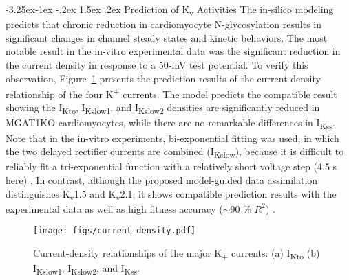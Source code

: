 \documentclass[11pt]{article}
\makeatletter
\renewcommand\subsection{\@startsection{subsection}{2}{\z@}%
                                     {-3.25ex\@plus -1ex \@minus -.2ex}%
                                     {1.5ex \@plus .2ex}%
                                     {\normalfont\fontfamily{phv}\fontsize{14}{17}\bfseries}}
\makeatother
\begin{document}
\subsection{Prediction of K\textsubscript{v} Activities}
The in-silico modeling predicts that chronic reduction in cardiomyocyte N-glycosylation results in significant changes in channel steady states and kinetic behaviors. The most notable result in the in-vitro experimental data was the significant reduction in the current density in response to a 50-mV test potential. To verify this observation, Figure~\ref{fig:current_density} presents the prediction results of the current-density relationship of the four K\textsuperscript{+} currents. The model predicts the compatible result showing the I\textsubscript{Kto}, I\textsubscript{Kslow1}, and I\textsubscript{Kslow2} densities are significantly reduced in MGAT1KO cardiomyocytes, while there are no remarkable differences in I\textsubscript{Kss}. Note that in the in-vitro experiments, bi-exponential fitting was used, in which the two delayed rectifier currents are combined (I\textsubscript{Kslow}), because it is difficult to reliably fit a tri-exponential function with a relatively short voltage step (4.5 s here) \citep{liu2011dissection}. In contrast, although the proposed model-guided data assimilation distinguishes K\textsubscript{v}1.5 and K\textsubscript{v}2.1, it shows compatible prediction results with the experimental data as well as high fitness accuracy ($\sim$90 \% $R^{2}$) \citep{ednie2019reduced}.
\begin{figure}[!ht]
    \centering
    \texttt{[image: figs/current\_density.pdf]}
    \caption{Current-density relationships of the major K\textsubscript{+} currents: (a) I\textsubscript{Kto} (b) I\textsubscript{Kslow1}, I\textsubscript{Kslow2}, and I\textsubscript{Kss}.}
    \label{fig:current_density}
\end{figure}
\end{document}
